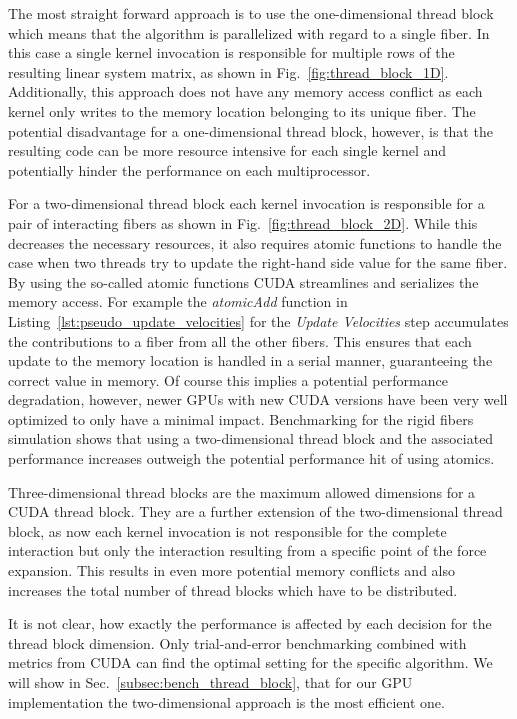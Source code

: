 The most straight forward approach is to use the one-dimensional thread block which means that the algorithm is parallelized with regard to a single fiber. In this case a single kernel invocation is responsible for multiple rows of the resulting linear system matrix, as shown in Fig.~\ref{fig:thread_block_1D}. Additionally, this approach does not have any memory access conflict as each kernel only writes to the memory location belonging to its unique fiber. The potential disadvantage for a one-dimensional thread block, however, is that the resulting code can be more resource intensive for each single kernel and potentially hinder the performance on each multiprocessor.

For a two-dimensional thread block each kernel invocation is responsible for a pair of interacting fibers as shown in Fig.~\ref{fig:thread_block_2D}. While this decreases the necessary resources, it also requires atomic functions to handle the case when two threads try to update the right-hand side value for the same fiber. By using the so-called atomic functions CUDA streamlines and serializes the memory access. For example the \emph{atomicAdd} function in Listing~\ref{lst:pseudo_update_velocities} for the \emph{Update Velocities} step accumulates the contributions to a fiber from all the other fibers. This ensures that each update to the memory location is handled in a serial manner, guaranteeing the correct value in memory. Of course this implies a potential performance degradation, however, newer GPUs with new CUDA versions have been very well optimized to only have a minimal impact. Benchmarking for the rigid fibers simulation shows that using a two-dimensional thread block and the associated performance increases outweigh the potential performance hit of using atomics.

Three-dimensional thread blocks are the maximum allowed dimensions for a CUDA thread block. They are a further extension of the two-dimensional thread block, as now each kernel invocation is not responsible for the complete interaction but only the interaction resulting from a specific point of the force expansion. This results in even more potential memory conflicts and also increases the total number of thread blocks which have to be distributed.

It is not clear, how exactly the performance is affected by each decision for the thread block dimension. Only trial-and-error benchmarking combined with metrics from CUDA can find the optimal setting for the specific algorithm. We will show in Sec.~\ref{subsec:bench_thread_block}, that for our GPU implementation the two-dimensional approach is the most efficient one.

